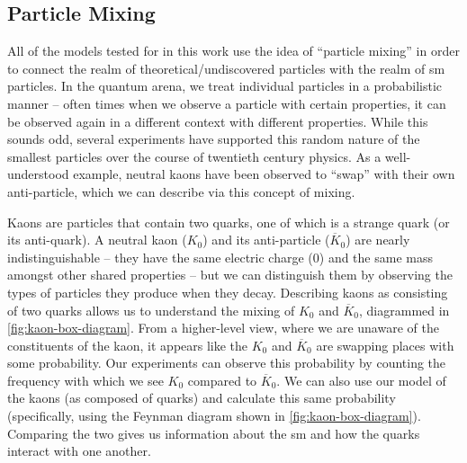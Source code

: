 \subsection{Particle Mixing}
All of the models tested for in this work use the idea of ``particle mixing'' in order to connect
the realm of theoretical/undiscovered particles with the realm of \ac{sm} particles. In the quantum
arena, we treat individual particles in a probabilistic manner -- often times when we observe a
particle with certain properties, it can be observed again in a different context with different
properties. While this sounds odd, several experiments have supported this random nature of the
smallest particles over the course of twentieth century physics. As a well-understood example,
neutral kaons have been observed to ``swap'' with their own anti-particle, which we can describe
via this concept of mixing.

Kaons are particles that contain two quarks, one of which is a strange quark (or its anti-quark). A
neutral kaon (\(K_0\)) and its anti-particle (\(\overline{K}_0\)) are nearly indistinguishable --
they have the same electric charge ($0$) and the same mass amongst other shared properties -- but
we can distinguish them by observing the types of particles they produce when they decay.
Describing kaons as consisting of two quarks allows us to understand the mixing of \(K_0\) and
\(\overline{K}_0\), diagrammed in \cref{fig:kaon-box-diagram}. From a higher-level view, where we
are unaware of the constituents of the kaon, it appears like the \(K_0\) and \(\overline{K}_0\) are
swapping places with some probability. Our experiments can observe this probability by counting the
frequency with which we see \(K_0\) compared to \(\overline{K}_0\). We can also use our model of the kaons (as composed of quarks) and calculate this
same probability (specifically, using the Feynman diagram shown in \cref{fig:kaon-box-diagram}).
Comparing the two gives us information about the \ac{sm} and how the quarks interact with one
another.

